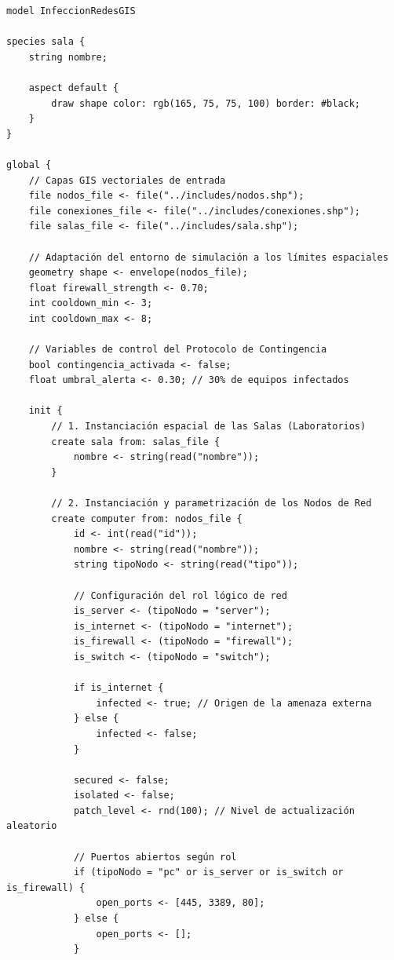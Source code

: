 \documentclass{ieeeaccess}
\begin{document}
\begin{lstlisting}[caption={InfeccionRedes.gaml - Código fuente de la simulación en GAMA Platform}, label={list:gaml_code}]
model InfeccionRedesGIS

species sala {
    string nombre;
    
    aspect default {
        draw shape color: rgb(165, 75, 75, 100) border: #black;
    }
}

global {
    // Capas GIS vectoriales de entrada
    file nodos_file <- file("../includes/nodos.shp");
    file conexiones_file <- file("../includes/conexiones.shp");
    file salas_file <- file("../includes/sala.shp");
    
    // Adaptación del entorno de simulación a los límites espaciales
    geometry shape <- envelope(nodos_file);
    float firewall_strength <- 0.70;
    int cooldown_min <- 3;
    int cooldown_max <- 8;
    
    // Variables de control del Protocolo de Contingencia
    bool contingencia_activada <- false;
    float umbral_alerta <- 0.30; // 30% de equipos infectados
    
    init {
        // 1. Instanciación espacial de las Salas (Laboratorios)
        create sala from: salas_file {
            nombre <- string(read("nombre"));
        }
        
        // 2. Instanciación y parametrización de los Nodos de Red
        create computer from: nodos_file {
            id <- int(read("id"));
            nombre <- string(read("nombre"));
            string tipoNodo <- string(read("tipo"));
            
            // Configuración del rol lógico de red
            is_server <- (tipoNodo = "server");
            is_internet <- (tipoNodo = "internet");
            is_firewall <- (tipoNodo = "firewall");
            is_switch <- (tipoNodo = "switch");
            
            if is_internet {
                infected <- true; // Origen de la amenaza externa
            } else {
                infected <- false;
            }
            
            secured <- false;
            isolated <- false;
            patch_level <- rnd(100); // Nivel de actualización aleatorio
            
            // Puertos abiertos según rol
            if (tipoNodo = "pc" or is_server or is_switch or is_firewall) {
                open_ports <- [445, 3389, 80];
            } else {
                open_ports <- [];
            }
            

\end{lstlisting}
\end{document}
